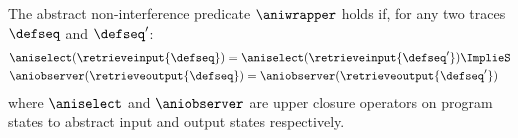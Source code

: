 The abstract non-interference predicate $\aniwrapper$ holds if, for any two traces $\defseq$ and $\defseq'$:
\begin{eqnarray*}
  \lefteqn{\aniselect(\retrieveinput{\defseq}) = \aniselect(\retrieveinput{\defseq'})
  \ImplieS} \\
    & \aniobserver(\retrieveoutput{\defseq}) = \aniobserver(\retrieveoutput{\defseq'})
\end{eqnarray*}
where $\aniselect$ and $\aniobserver$ are upper closure operators on program states to abstract input and output states respectively.
